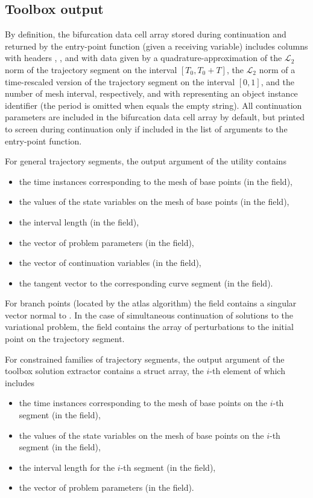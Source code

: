 \subsection{Toolbox output}
By definition, the bifurcation data cell array stored during continuation and returned by the  entry-point function (given a receiving variable) includes columns with headers , , and  with data given by a quadrature-approximation of the $\mathcal{L}_2$ norm of the trajectory segment on the interval $[T_0,T_0+T]$, the $\mathcal{L}_2$ norm of a time-rescaled version of the trajectory segment on the interval $[0,1]$, and the number of mesh interval, respectively, and with  representing an object instance identifier (the period is omitted when  equals the empty string). All continuation parameters are included in the bifurcation data cell array by default, but printed to screen during continuation only if included in the list of arguments to the  entry-point function.

For general trajectory segments,  the  output argument of the  utility contains
\begin{itemize}
\item the time instances corresponding to the mesh of base points (in the  field),
\item the values of the state variables on the mesh of base points (in the  field),
\item the interval length (in the  field),
\item the vector of problem parameters (in the  field),
\item the vector of continuation variables (in the  field),
\item the tangent vector to the corresponding curve segment (in the  field).
\end{itemize}
For branch points (located by the atlas algorithm) the  field contains a singular vector normal to . In the case of simultaneous continuation of solutions to the variational problem, the field  contains the array of perturbations to the initial point on the trajectory segment.

For constrained families of trajectory segments, the  output argument of the toolbox solution extractor  contains a struct array, the $i$-th element of which includes
\begin{itemize}
\item the time instances corresponding to the mesh of base points on the $i$-th segment (in the  field),
\item the values of the state variables on the mesh of base points on the $i$-th segment (in the  field),
\item the interval length for the $i$-th segment (in the  field),
\item the vector of problem parameters (in the  field).
\end{itemize}

